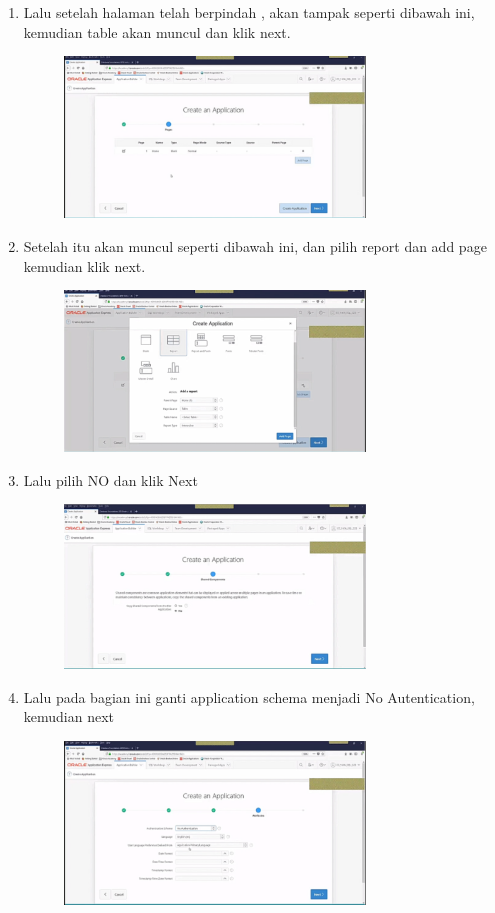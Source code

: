 \documentclass{article}
\begin{document}
\begin{enumerate}
\item  Lalu setelah halaman telah berpindah , akan tampak seperti dibawah ini, kemudian table akan muncul dan klik next. 
\begin{figure}[h]
\centerline{\includegraphics[width=8cm]{figure/H.png}}
            \end{figure}

\item  Setelah itu akan muncul seperti dibawah ini, dan pilih report dan add page kemudian  klik next.
\begin{figure}[h]
\centerline{\includegraphics[width=8cm]{figure/I.png}}
            \end{figure}
\item  Lalu pilih NO dan klik Next
\begin{figure}[h]
\centerline{\includegraphics[width=8cm]{figure/J.png}}
            \end{figure}
\item  Lalu pada bagian ini ganti application schema menjadi No Autentication, kemudian next
\begin{figure}[h]
\centerline{\includegraphics[width=8cm]{figure/K.png}}

\end{figure}
\end{enumerate}
\end{document}
